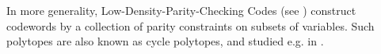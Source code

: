 \begin{example}
    In more generality, Low-Density-Parity-Checking Codes (see \cite{gallager_low-density_1963}) construct codewords by a collection of parity constraints on subsets of variables.
    Such polytopes are also known as cycle polytopes, and studied e.g. in \cite{grotschel_geometric_1993}.

\end{example}